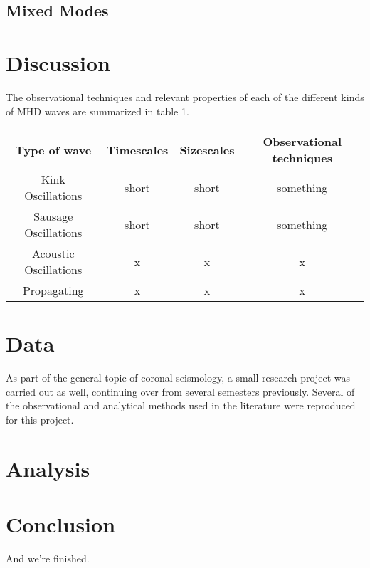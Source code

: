 \documentclass[preprint2]{aastex}
\begin{document}
\subsection{Mixed Modes}




\section{Discussion}\label{disc}
The observational techniques and relevant properties of each of the different
kinds of MHD waves are summarized in table 1.
\begin{table*}[ht]
    \centering
    \begin{tabular}{c c c c}
        \toprule
        Type of wave &
        Timescales &
        Sizescales &
        Observational techniques\\
        \midrule
        Kink Oscillations & short & short & something\\
        Sausage Oscillations & short & short & something\\
        Acoustic Oscillations & x & x & x\\
        Propagating & x & x & x\\
        \bottomrule
    \end{tabular}
\end{table*}

\section{Data}\label{data}
As part of the general topic of coronal seismology,
a small research project was carried out as well, continuing
over from several semesters previously. Several of the observational
and analytical methods used in the literature were reproduced for
this project.

\section{Analysis}\label{analysis}

\section{Conclusion}\label{conclusion}
And we're finished.


\end{document}
